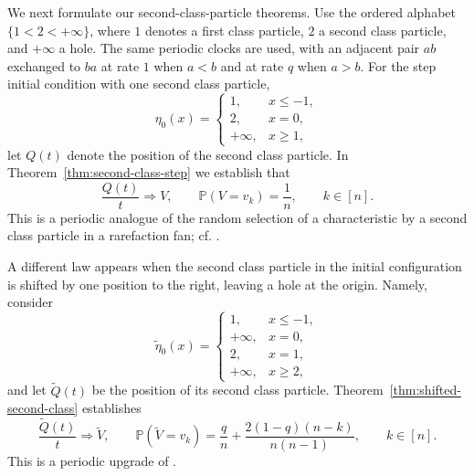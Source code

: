 \documentclass[11pt,a4paper]{amsart}
\theoremstyle{definition}
\theoremstyle{remark}
\numberwithin{equation}{section}
\newcommand{\Pp}{\mathbb P}
\begin{document}
	We next formulate our second-class-particle theorems.  Use the ordered
	alphabet $\{1<2<+\infty\}$, where $1$ denotes a first class particle, $2$ a
	second class particle, and $+\infty$ a hole.  The same periodic clocks are
	used, with an adjacent pair $ab$ exchanged to $ba$ at rate $1$ when $a<b$
	and at rate $q$ when $a>b$.  For the step initial condition with one second
	class particle,
	\begin{equation}\label{eq:introduction-second-class-step}
		\eta_0(x)=
		\begin{cases}
			1,&x\le-1,\\
			2,&x=0,\\
			+\infty,&x\ge1,
		\end{cases}
	\end{equation}
	let $Q(t)$ denote the position of the second class particle. In Theorem~\ref{thm:second-class-step} we establish that
	\begin{equation}\label{eq:introduction-uniform-second-class-law}
		\frac{Q(t)}{t}\Longrightarrow V,
		\qquad
		\Pp(V=v_k)=\frac1n,
		\qquad k\in[n].
	\end{equation}
	This is a periodic analogue of the random selection of a characteristic by
	a second class particle in a rarefaction fan; cf.
	\cite{FerrariKipnis,FerrariGoncalvesMartin,AmirAngelValko,AggarwalCorwinGhosal}.
	
	A different law appears when the second class particle in the initial configuration is shifted by one
	position to the right, leaving a hole at the origin.  Namely, consider
	\begin{equation}\label{eq:introduction-shifted-second-class-step}
		\widetilde\eta_0(x)=
		\begin{cases}
			1,&x\le-1,\\
			+\infty,&x=0,\\
			2,&x=1,\\
			+\infty,&x\ge2,
		\end{cases}
	\end{equation}
	and let $\widetilde Q(t)$ be the position of its second class particle.
	Theorem~\ref{thm:shifted-second-class} establishes
	\begin{equation}\label{eq:introduction-shifted-speed-law}
		\frac{\widetilde Q(t)}{t}\Longrightarrow\widetilde V,
		\qquad
		\Pp(\widetilde V=v_k)
		=\frac qn+\frac{2(1-q)(n-k)}{n(n-1)},
		\qquad k\in[n].
	\end{equation}
	This is a periodic upgrade of \cite[Theorem 5.2 and Example 5.7]{BorodinBufetovColorPosition}. 
	
\end{document}
